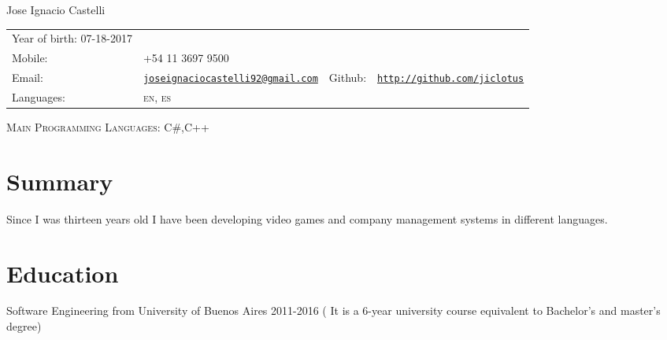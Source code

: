 \documentclass[letterpaper]{article}
\def\name{Jose Ignacio Castelli}
\newenvironment{no-indent-itemize}{
  \begin{list}{}{
    \setlength{\leftmargin}{0em}
  }
}{
  \end{list}
}
\begin{document}
{\huge \name}

\bigskip
\begin{minipage}{0.45\linewidth}
  \begin{tabular}{llll}
    Year of birth: 07-18-2017\\
    Mobile: & +54 11 3697 9500
    \\
    Email: & \href{mailto:joseignaciocastelli92@gmail.com}{\tt joseignaciocastelli92@gmail.com} 
       & Github: &\href{http://github.com/jiclotus}{\tt http://github.com/jiclotus}\\
    Languages: & \textsc{en}, \textsc{es}
  \end{tabular}
\end{minipage}

\bigskip
\textsc{Main Programming Languages}: C\#,C++

\section*{Summary}
\begin{no-indent-itemize}
    \item Since I was thirteen years old I have been developing video games and company management systems in different languages. 
\end{no-indent-itemize}

\section*{Education}
\begin{no-indent-itemize}
  \item  Software Engineering from University of Buenos Aires 2011-2016 ( It is a 6-year university course equivalent to Bachelor's and master's degree) 
\end{no-indent-itemize}
\end{document}
